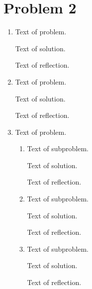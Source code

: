 \documentclass[11pt]{article}
\begin{document}
\section*{Problem 2}
	\begin{enumerate}
	\item
	\begin{problem}
	Text of problem.
	\end{problem}
	\begin{solution}
	Text of solution.
	\end{solution}
	\begin{reflection}
	Text of reflection.
	\end{reflection}	

	\item
	\begin{problem}
		Text of problem.
	\end{problem}
	\begin{solution}
		Text of solution.
	\end{solution}
	\begin{reflection}
		Text of reflection.
	\end{reflection}	

	\item
	\begin{problem}
	Text of problem.
	\end{problem}
	\begin{enumerate}
		\item
		\begin{problem}
			Text of subproblem.
		\end{problem}
		\begin{solution}
			Text of solution.
		\end{solution}
		\begin{reflection}
			Text of reflection.
		\end{reflection}	
	
		\item
		\begin{problem}
			Text of subproblem.
		\end{problem}
		\begin{solution}
			Text of solution.
		\end{solution}
		\begin{reflection}
			Text of reflection.
		\end{reflection}	
		
		\item
		\begin{problem}
			Text of subproblem.
		\end{problem}
		\begin{solution}
			Text of solution.
		\end{solution}
		\begin{reflection}
			Text of reflection.
		\end{reflection}	
	\end{enumerate}
\end{enumerate}
	
\end{document}
